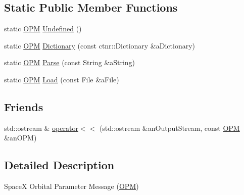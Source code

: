 \subsection*{Static Public Member Functions}
\begin{DoxyCompactItemize}
\item 
static \hyperlink{classostk_1_1astro_1_1trajectory_1_1orbit_1_1messages_1_1spacex_1_1_o_p_m}{O\+PM} \hyperlink{classostk_1_1astro_1_1trajectory_1_1orbit_1_1messages_1_1spacex_1_1_o_p_m_a971c85e7253806f554ff79b6ac4e6b36}{Undefined} ()
\item 
static \hyperlink{classostk_1_1astro_1_1trajectory_1_1orbit_1_1messages_1_1spacex_1_1_o_p_m}{O\+PM} \hyperlink{classostk_1_1astro_1_1trajectory_1_1orbit_1_1messages_1_1spacex_1_1_o_p_m_a1cd4c53e5959572f27a3f77a0d8c0db3}{Dictionary} (const ctnr\+::\+Dictionary \&a\+Dictionary)
\item 
static \hyperlink{classostk_1_1astro_1_1trajectory_1_1orbit_1_1messages_1_1spacex_1_1_o_p_m}{O\+PM} \hyperlink{classostk_1_1astro_1_1trajectory_1_1orbit_1_1messages_1_1spacex_1_1_o_p_m_a1867729446aee4963bb4b22f6bba43e1}{Parse} (const String \&a\+String)
\item 
static \hyperlink{classostk_1_1astro_1_1trajectory_1_1orbit_1_1messages_1_1spacex_1_1_o_p_m}{O\+PM} \hyperlink{classostk_1_1astro_1_1trajectory_1_1orbit_1_1messages_1_1spacex_1_1_o_p_m_a86bc7b60ac00536fa516d03282cb2c90}{Load} (const File \&a\+File)
\end{DoxyCompactItemize}
\subsection*{Friends}
\begin{DoxyCompactItemize}
\item 
std\+::ostream \& \hyperlink{classostk_1_1astro_1_1trajectory_1_1orbit_1_1messages_1_1spacex_1_1_o_p_m_a6eda3865ebfda6f309f8ac0f071ece85}{operator$<$$<$} (std\+::ostream \&an\+Output\+Stream, const \hyperlink{classostk_1_1astro_1_1trajectory_1_1orbit_1_1messages_1_1spacex_1_1_o_p_m}{O\+PM} \&an\+O\+PM)
\end{DoxyCompactItemize}


\subsection{Detailed Description}
SpaceX Orbital Parameter Message (\hyperlink{classostk_1_1astro_1_1trajectory_1_1orbit_1_1messages_1_1spacex_1_1_o_p_m}{O\+PM}) 

